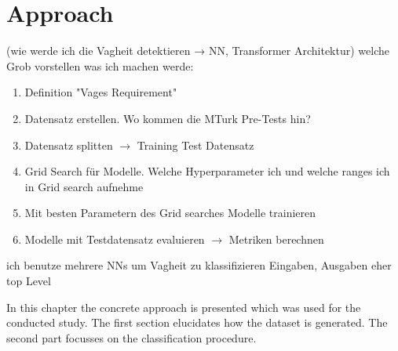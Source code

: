 \chapter{Approach}
\label{chp:approach}
(wie werde ich die Vagheit detektieren → NN, Transformer Architektur) welche
Grob vorstellen was ich machen werde:
\begin{enumerate}
    \item Definition "Vages Requirement"
    \item Datensatz erstellen. Wo kommen die MTurk Pre-Tests hin?
    \item Datensatz splitten $\rightarrow$ Training Test Datensatz
    \item Grid Search für Modelle. Welche Hyperparameter ich und welche ranges ich in Grid search aufnehme
    \item Mit besten Parametern des Grid searches Modelle trainieren
    \item Modelle mit Testdatensatz evaluieren $\rightarrow$ Metriken berechnen
\end{enumerate}

ich benutze mehrere NNs um Vagheit zu klassifizieren
Eingaben, Ausgaben
eher top Level

In this chapter the concrete approach is presented which was used for the conducted study.
The first section elucidates how the dataset is generated.
The second part focusses on the classification procedure.
